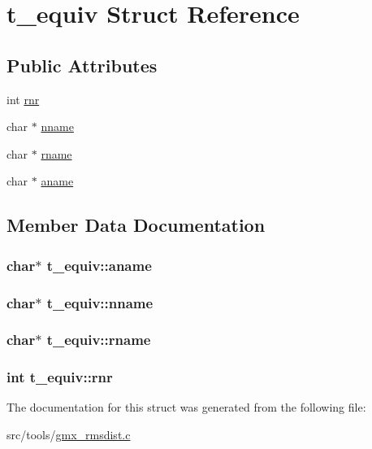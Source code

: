 \hypertarget{structt__equiv}{\section{t\-\_\-equiv \-Struct \-Reference}
\label{structt__equiv}
}
\subsection*{\-Public \-Attributes}
\begin{DoxyCompactItemize}
\item 
int \hyperlink{structt__equiv_a0080918caa39e95de210c9ca52ca6fba}{rnr}
\item 
char $\ast$ \hyperlink{structt__equiv_ad6e5b2057165f69af65b50e72e3558fb}{nname}
\item 
char $\ast$ \hyperlink{structt__equiv_aac8f01db8a72a5a95d08a7e33f658b44}{rname}
\item 
char $\ast$ \hyperlink{structt__equiv_aae4cbc4197500e9602b95242372d778e}{aname}
\end{DoxyCompactItemize}


\subsection{\-Member \-Data \-Documentation}
\hypertarget{structt__equiv_aae4cbc4197500e9602b95242372d778e}{
\subsubsection[{aname}]{\setlength{\rightskip}{0pt plus 5cm}char$\ast$ {\bf t\-\_\-equiv\-::aname}}}\label{structt__equiv_aae4cbc4197500e9602b95242372d778e}
\hypertarget{structt__equiv_ad6e5b2057165f69af65b50e72e3558fb}{
\subsubsection[{nname}]{\setlength{\rightskip}{0pt plus 5cm}char$\ast$ {\bf t\-\_\-equiv\-::nname}}}\label{structt__equiv_ad6e5b2057165f69af65b50e72e3558fb}
\hypertarget{structt__equiv_aac8f01db8a72a5a95d08a7e33f658b44}{
\subsubsection[{rname}]{\setlength{\rightskip}{0pt plus 5cm}char$\ast$ {\bf t\-\_\-equiv\-::rname}}}\label{structt__equiv_aac8f01db8a72a5a95d08a7e33f658b44}
\hypertarget{structt__equiv_a0080918caa39e95de210c9ca52ca6fba}{
\subsubsection[{rnr}]{\setlength{\rightskip}{0pt plus 5cm}int {\bf t\-\_\-equiv\-::rnr}}}\label{structt__equiv_a0080918caa39e95de210c9ca52ca6fba}


\-The documentation for this struct was generated from the following file\-:\begin{DoxyCompactItemize}
\item 
src/tools/\hyperlink{gmx__rmsdist_8c}{gmx\-\_\-rmsdist.\-c}\end{DoxyCompactItemize}
